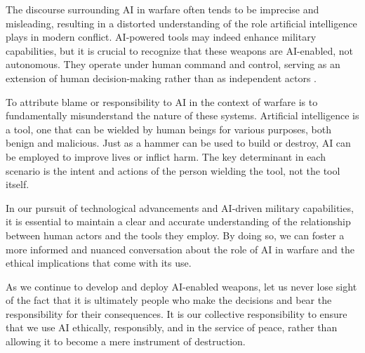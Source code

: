 The discourse surrounding AI in warfare often tends to be imprecise and misleading, resulting in a distorted understanding of the role artificial intelligence plays in modern conflict. AI-powered tools may indeed enhance military capabilities, but it is crucial to recognize that these weapons are AI-enabled, not autonomous. They operate under human command and control, serving as an extension of human decision-making rather than as independent actors \cite{aiwarfare}.

To attribute blame or responsibility to AI in the context of warfare is to fundamentally misunderstand the nature of these systems. Artificial intelligence is a tool, one that can be wielded by human beings for various purposes, both benign and malicious. Just as a hammer can be used to build or destroy, AI can be employed to improve lives or inflict harm. The key determinant in each scenario is the intent and actions of the person wielding the tool, not the tool itself.

In our pursuit of technological advancements and AI-driven military capabilities, it is essential to maintain a clear and accurate understanding of the relationship between human actors and the tools they employ. By doing so, we can foster a more informed and nuanced conversation about the role of AI in warfare and the ethical implications that come with its use.

As we continue to develop and deploy AI-enabled weapons, let us never lose sight of the fact that it is ultimately people who make the decisions and bear the responsibility for their consequences. It is our collective responsibility to ensure that we use AI ethically, responsibly, and in the service of peace, rather than allowing it to become a mere instrument of destruction.

